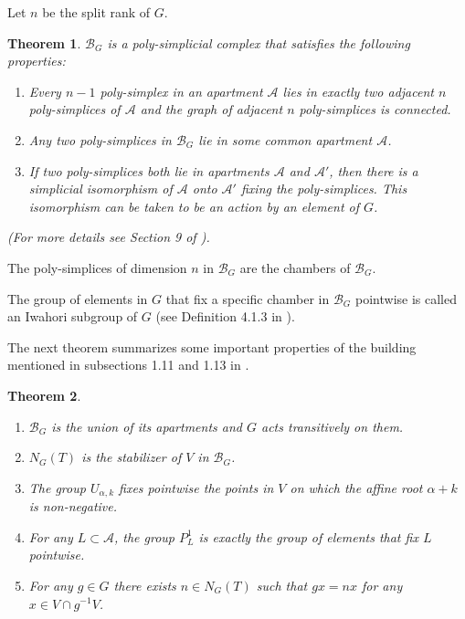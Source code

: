 \documentclass[12pt]{article}
\newcommand{\A}{\mathcal{A}}
\newcommand{\B}{\mathcal{B}}
\newcommand{\<}{\langle}
\renewcommand{\>}{\rangle}
\theoremstyle{plain}
\newtheorem{theorem}{Theorem}[section] %
\theoremstyle{definition}
\begin{document}
Let $n$ be the split rank of $G$.

\begin{theorem}\label{2.10}
$\B_G$ is a poly-simplicial complex that satisfies the following properties:
\begin{enumerate}
    \item Every $n-1$ poly-simplex in an apartment $\A$ lies in exactly two adjacent $n$ poly-simplices of $\A$ and the graph of adjacent $n$ poly-simplices is connected.
    \item Any two poly-simplices in $\B_G$ lie in some common apartment $\A$.
    \item If two poly-simplices both lie in apartments $\A$ and $\A'$, then there is a simplicial isomorphism of $\A$ onto $\A'$ fixing the poly-simplices. This isomorphism can be taken to be an action by an element of $G$.
\end{enumerate} (For more details see Section 9 of \cite{Landvogt1995ACO}).

\end{theorem}

The poly-simplices of dimension $n$ in $\B_G$ are the chambers of $\B_G$. 

The group of elements in $G$ that fix a specific chamber in $\B_G$ pointwise is called an Iwahori subgroup of $G$ (see Definition 4.1.3 in \cite{BruhatTitsTA}).

The next theorem summarizes some important properties of the building mentioned in subsections 1.11 and 1.13 in \cite{delorm}.

\begin{theorem}\label{2.11}

\begin{enumerate}
    \item $\B_G$ is the union of its apartments and $G$ acts transitively on them.
    \item $N_G(T)$ is the stabilizer of $V$ in $\B_G$. 
    \item The group $U_{\alpha,k}$ fixes pointwise the points in $V$ on which the affine root $\alpha+k$ is non-negative.  
    \item For any $L\subset \A$, the group $P^1_L$ is exactly the group of elements that fix $L$ pointwise.
    \item For any $g\in G$ there exists $n\in N_G(T)$ such that $gx=nx$ for any $x\in V\cap g^{-1}V$.
\end{enumerate}
\end{theorem}
\end{document}
